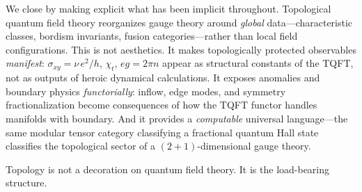 \bigskip
We close by making explicit what has been implicit throughout.  Topological quantum field theory reorganizes gauge theory around \emph{global} data---characteristic classes, bordism invariants, fusion categories---rather than local field configurations.  This is not aesthetics.  It makes topologically protected observables \emph{manifest}: $\sigma_{xy}=\nu\, e^2/h$, $\chi_t$, $eg=2\pi n$ appear as structural constants of the TQFT, not as outputs of heroic dynamical calculations.  It exposes anomalies and boundary physics \emph{functorially}: inflow, edge modes, and symmetry fractionalization become consequences of how the TQFT functor handles manifolds with boundary.  And it provides a \emph{computable} universal language---the same modular tensor category classifying a fractional quantum Hall state classifies the topological sector of a $(2{+}1)$-dimensional gauge theory.

Topology is not a decoration on quantum field theory.  It is the load-bearing structure.

